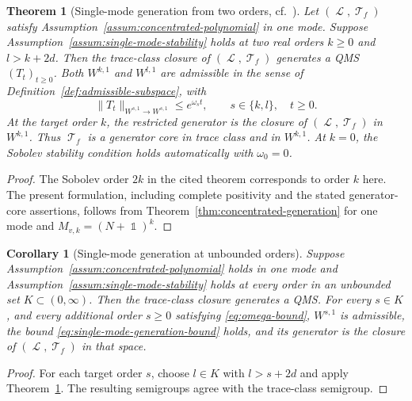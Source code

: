 \documentclass[11pt]{article}
\theoremstyle{myplain}
\newtheorem{thm}{Theorem}[section]
\newtheorem{cor}[cor]{Corollary}
\theoremstyle{mydefinition}
\theoremstyle{remark}
\DeclareMathOperator{\cL}{\mathcal{L}}
\DeclareMathOperator{\cT}{\mathcal{T}}
\DeclareMathOperator{\1}{\mathds{1}}
\begin{document}
    \begin{thm}[Single-mode generation from two orders, cf.~{\cite[Thm.~3.1 and Rem.~5]{Gondolf.2024}}]\label{thm:single-mode-generation}
        Let $(\cL,\cT_f)$ satisfy Assumption~\ref{assum:concentrated-polynomial}
        in one mode. Suppose Assumption~\ref{assum:single-mode-stability} holds
        at two real orders $k \geq 0$ and $l > k + 2d$.
        Then the trace-class closure of $(\cL,\cT_f)$ generates a
        QMS $(T_t)_{t\geq0}$. Both $W^{k,1}$ and $W^{l,1}$ are
        admissible in the sense of Definition~\ref{def:admissible-subspace}, with
        \begin{equation}\label{eq:single-mode-generation-bound}
            \|T_t\|_{W^{s,1}\to W^{s,1}}\leq e^{\omega_s t},
            \qquad s\in\{k,l\},\quad t\geq0.
        \end{equation}
        At the target order $k$, the restricted generator is the
        closure of $(\cL,\cT_f)$ in $W^{k,1}$. Thus $\cT_f$ is a
        generator core in trace class and in $W^{k,1}$.
        At $k=0$, the Sobolev stability condition holds automatically with $\omega_0=0$.
    \end{thm}
    \begin{proof}
        The Sobolev order $2k$ in the cited theorem corresponds to
        order $k$ here. The present formulation, including complete
        positivity and the stated generator-core assertions, follows from
        Theorem~\ref{thm:concentrated-generation} for one mode and $M_{v,k}=(N+\1)^k$.
    \end{proof}

    \begin{cor}[Single-mode generation at unbounded orders]\label{cor:single-mode-generation-unbounded}
        Suppose Assumption~\ref{assum:concentrated-polynomial} holds in one mode
        and Assumption~\ref{assum:single-mode-stability} holds at every order in an
        unbounded set $K\subset(0,\infty)$. Then the trace-class closure
        generates a QMS. For every $s\in K$, and every additional order
        $s\geq0$ satisfying \eqref{eq:omega-bound}, $W^{s,1}$ is admissible,
        the bound \eqref{eq:single-mode-generation-bound} holds, and its
        generator is the closure of $(\cL,\cT_f)$ in that space.
    \end{cor}
    \begin{proof}
        For each target order $s$, choose $l\in K$ with $l>s+2d$ and
        apply Theorem~\ref{thm:single-mode-generation}. The resulting semigroups
        agree with the trace-class semigroup.
    \end{proof}
    
\end{document}
